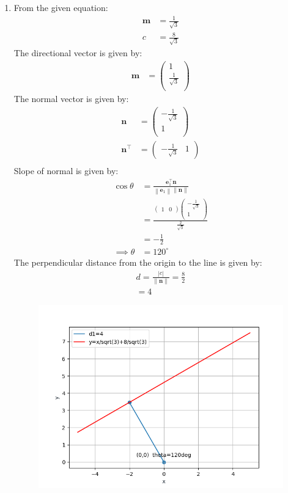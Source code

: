 \documentclass[12pt]{article}
\providecommand{\norm}[1]{\left\lVert#1\right\rVert}
\newcommand{\myvec}[1]{\ensuremath{\begin{pmatrix}#1\end{pmatrix}}}
\let\vec\mathbf
\begin{document}
\begin{enumerate}
\item From the given equation:
	\begin{align}
		\vec{m}&=\frac{1}{\sqrt{3}}\\
		c&=\frac{8}{\sqrt{3}}
	\end{align}
        The directional vector is given by:
	\begin{align}
		\vec{m}&=\myvec{1\\\frac{1}{\sqrt{3}}\\}
	\end{align}
	The normal vector is given by:
		\begin{align}
	\vec{n}&=\myvec{-\frac{1}{\sqrt{3}}\\1\\}\\
	\vec{n}^\top&=\myvec{-\frac{1}{\sqrt{3}} & 1}\\
			\end{align}
	Slope of normal is given by:
		\begin{align}
			\cos\theta&=\frac{\vec{e}_{1}^\top\vec{n}}{\norm{\vec{e}_{1}}\norm{\vec{n}}}\\
			&=\frac{\myvec{1&0}\myvec{-\frac{1}{\sqrt{3}} \\ 1\\}}{\frac{2}{\sqrt{3}}}\\
			&=-\frac{1}{2}\\
			\implies	\theta&=120^\circ
		\end{align}
	The perpendicular distance from the origin to the line is given by:
		\begin{align}
			d=\frac{|c|}{\norm{\vec{n}}}=\frac{8}{2}\\
			=4
		\end{align}
\begin{figure}[!h]
	\begin{center} 
	    \includegraphics[width=\columnwidth]{./figs/line1.png}
	\end{center}
\caption{}
\label{fig:Fig}
\end{figure}
	


\end{enumerate}
\end{document}
